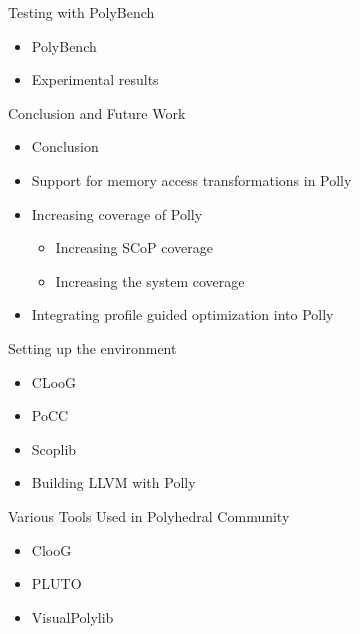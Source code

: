 \documentclass{beamer}
\begin{document}
\begin{frame}{Testing with PolyBench}
\begin{itemize}
\item PolyBench
\item Experimental results
\end{itemize}
\end{frame}

\begin{frame}{Conclusion and Future Work}
\begin{itemize}
\item Conclusion
\item Support for memory access transformations in Polly
\item Increasing coverage of Polly
	\begin{itemize}
	\item Increasing SCoP coverage
	\item Increasing the system coverage
	\end{itemize}
\item Integrating profile guided optimization into Polly
\end{itemize}
\end{frame}

\begin{frame}{Setting up the environment}
\begin{itemize}
\item CLooG
\item PoCC
\item Scoplib
\item Building LLVM with Polly
\end{itemize}
\end{frame}

\begin{frame}{Various Tools Used in Polyhedral Community}
\begin{itemize}
\item ClooG
\item PLUTO
\item VisualPolylib
\end{itemize}
\end{frame}
\end{document}
